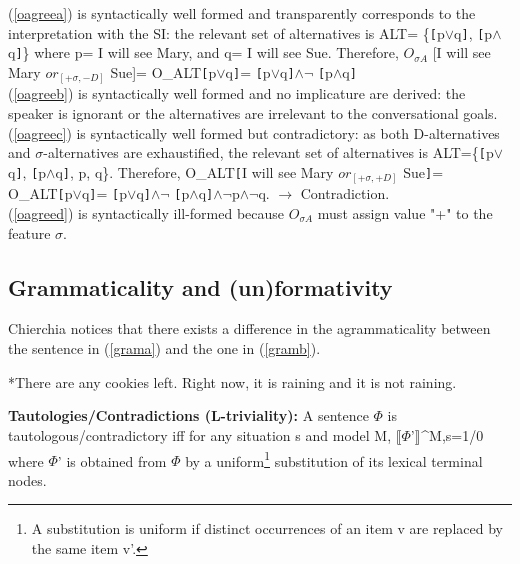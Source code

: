 \documentclass[a4paper,11pt]{article}
\newcommand{\reff}[1]{(\ref{#1})}
\newcommand{\eval}[2][]{$\llbracket$#2$\rrbracket_{#1}$}
\begin{document}
\reff{oagreea} is syntactically well formed and transparently corresponds to the interpretation with the SI: the relevant set of alternatives is ALT= \{\verb![!p$\vee$q\verb!]!, \verb![!p$\wedge$q\verb!]!\} where p= I will see Mary, and q= I will see Sue. Therefore, $O_{\sigma A}$ [I will see Mary $or_{[+\sigma, -D]}$ Sue]= O_{ALT}\verb![!p$\vee$q\verb!]!= \verb![!p$\vee$q\verb!]!$\wedge\neg$ \verb![!p$\wedge$q\verb!]!
\\\reff{oagreeb} is syntactically well formed and no implicature  are derived: the speaker is ignorant or the alternatives are irrelevant to the conversational goals.
\\\reff{oagreec} is syntactically well formed but contradictory: as both D-alternatives and $\sigma$-alternatives are exhaustified, the relevant set of alternatives is ALT=\{\verb![!p$\vee$q\verb!]!, \verb![!p$\wedge$q\verb!]!, p, q\}. Therefore, O_{ALT}\verb![!I will see Mary $or_{[+\sigma,+D]}$ Sue\verb!]!= O_{ALT}\verb![!p$\vee$q\verb!]!= \verb![!p$\vee$q\verb!]!$\wedge\neg$ \verb![!p$\wedge$q\verb!]!$\wedge\neg$p$\wedge\neg$q. $\rightarrow$ Contradiction.
\\\reff{oagreed} is syntactically ill-formed because $O_{\sigma A}$  must assign value "+" to the feature $\sigma$.

\subsection{Grammaticality and (un)formativity}
Chierchia notices that there exists a difference in the agrammaticality between the sentence in \reff{grama} and the one in \reff{gramb}.

 \begin{exe}
 	\ex\label{gram}
 		\begin{xlist}
 		\ex\label{grama} *There are any cookies left.
 		\ex\label{gramb} Right now, it is raining and it is not raining.
 		\end{xlist}
 \end{exe}
 
\begin{exe}
\ex\label{taut} \textbf{Tautologies/Contradictions (L-triviality):} A sentence $\Phi$ is tautologous/contradictory iff for any situation s and model M, \eval{$\Phi$'}^{M,s}=1/0 where $\Phi$' is obtained from $\Phi$ by a uniform\footnote{A substitution is uniform if distinct occurrences of an item v are replaced by the same item v'.} substitution of its lexical terminal nodes.
\end{exe}
\end{document}
